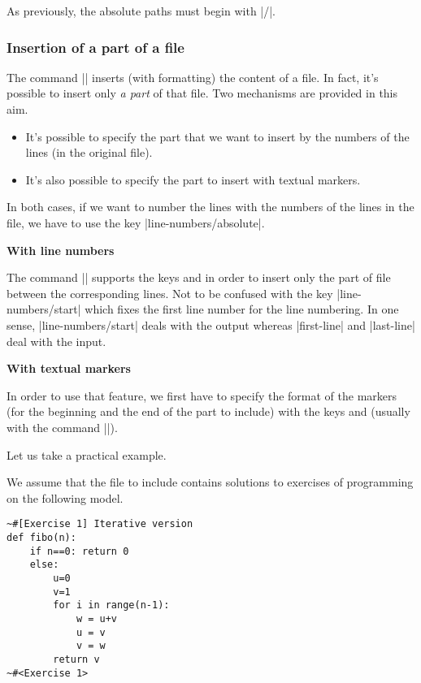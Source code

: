 \documentclass{article}
\begin{document}
As previously, the absolute paths must begin with |/|.

\bigskip
\subsubsection{Insertion of a part of a file}

\label{part-of-a-file}

The command |\PitonInputFile| inserts (with formatting) the content of a file.
In fact, it's possible to insert only \emph{a part} of that file. Two
mechanisms are provided in this aim.
\begin{itemize}
\item It's possible to specify the part that we want to insert by the numbers
of the lines (in the original file).
\item It's also possible to specify the part to insert with textual markers.
\end{itemize}
In both cases, if we want to number the lines with the numbers of the
lines in the file, we have to use the key |line-numbers/absolute|.

\bigskip
\textbf{With line numbers}

\nobreak
The command |\PitonInputFile| supports the keys  and
 in order to insert only the part of file between the
corresponding lines. Not to be confused with the key |line-numbers/start|
which fixes the first line number for the line numbering. In one sense,
|line-numbers/start| deals with the output whereas |first-line| and
|last-line| deal with the input.

\bigskip
\textbf{With textual markers}

\nobreak
{}

In order to use that feature, we first have to specify the format of the
markers (for the beginning and the end of the part to include) with the keys
 and  (usually with the
command |\PitonOptions|). 


\medskip
Let us take a practical example.

\medskip
We assume that the file to include contains solutions to exercises of
programming on the following model.

\begin{small}
\begin{Verbatim}
~#[Exercise 1] Iterative version
def fibo(n):
    if n==0: return 0 
    else:
        u=0
        v=1
        for i in range(n-1):
            w = u+v
            u = v
            v = w
        return v
~#<Exercise 1>
\end{Verbatim}
\end{small}
\end{document}
